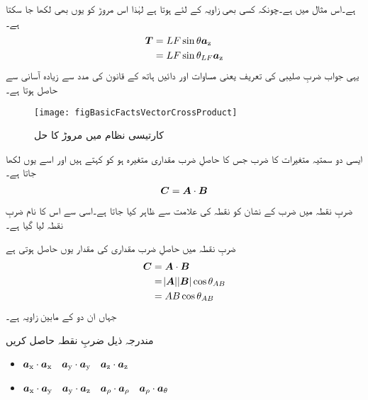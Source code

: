ہے۔اس مثال میں  ہے۔چونکہ کسی بھی زاویہ    کے لئے  ہوتا ہے لہٰذا اس مروڑ کو یوں بھی لکھا جا سکتا ہے۔
\begin{align*}
{\ensuremath{{\boldsymbol{T}}}}&=LF\sin \theta {\boldsymbol{a}}_{\textup{z}}\\
&=L F \sin \theta_{LF}{\boldsymbol{a}}_{\textup{z}}
\end{align*}
یہی جواب ضربِ صلیبی کی تعریف یعنی مساوات  اور دائیں ہاتھ کے قانون کی مدد سے زیادہ آسانی سے حاصل ہوتا ہے۔
%
\begin{figure}
\centering
\texttt{[image: figBasicFactsVectorCrossProduct]}
\caption{کارتیسی نظام میں مروڑ کا حل}
\label{شکل_حقائق_کارتیسی_مروڑ_کا_حل}
\end{figure}
%
ایسی دو سمتیہ متغیرات کا ضرب جس کا حاصلِ ضرب مقداری متغیرہ ہو کو  کہتے ہیں اور اسے یوں لکھا جاتا ہے۔
\begin{align}
{\ensuremath{{\boldsymbol{C}}}}={{\boldsymbol{A}}} \cdot {\ensuremath{{\boldsymbol{B}}}}
\end{align}
ضربِ نقطہ میں ضرب کے نشان کو نقطہ کی علامت سے ظاہر کیا جاتا ہے۔اسی سے اس کا نام ضربِ نقطہ لیا گیا ہے۔

ضربِ نقطہ میں حاصلِ ضرب مقداری کی مقدار یوں حاصل ہوتی ہے
\begin{gather}
\begin{aligned}\label{مساوات_بنیادی_ضرب_نقطہ_تعریف}
{\ensuremath{{\boldsymbol{C}}}}&={{\boldsymbol{A}}} \cdot {\ensuremath{{\boldsymbol{B}}}}\\
&=\abs{{{\boldsymbol{A}}}} \abs{{{\boldsymbol{B}}}} \cos \theta_{AB}\\
&=A B \cos \theta_{AB}
\end{aligned}
\end{gather}
جہاں  ان دو کے مابین زاویہ ہے۔

مندرجہ ذیل ضربِ نقطہ حاصل کریں
\begin{itemize}
\item
${\boldsymbol{a}}_{\textup{x}} \cdot {\boldsymbol{a}}_{\textup{x}} \quad {\boldsymbol{a}}_{\textup{y}} \cdot {\boldsymbol{a}}_{\textup{y}} \quad {\boldsymbol{a}}_{\textup{z}} \cdot {\boldsymbol{a}}_{\textup{z}}$\\
\item
${\boldsymbol{a}}_{\textup{x}} \cdot {\boldsymbol{a}}_{\textup{y}} \quad {\boldsymbol{a}}_{\textup{y}} \cdot {\boldsymbol{a}}_{\textup{z}} \quad {\boldsymbol{a}}_{\rho} \cdot {\boldsymbol{a}}_{\rho} \quad {\boldsymbol{a}}_{\rho} \cdot {\boldsymbol{a}}_{\theta}$
\end{itemize}

